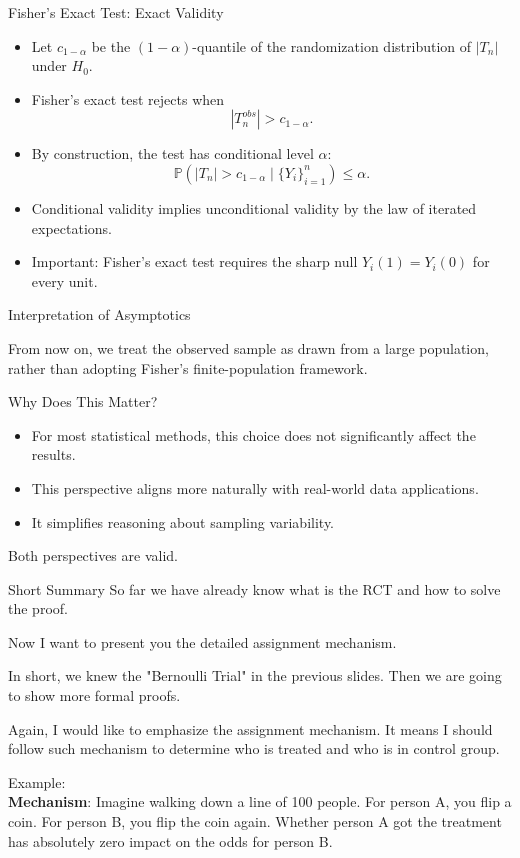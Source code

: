 \documentclass[11pt,aspectratio=169]{beamer}
\begin{document}
\begin{frame}{Fisher's Exact Test: Exact Validity}

\begin{itemize}
    \item Let $c_{1-\alpha}$ be the $(1-\alpha)$-quantile of the randomization distribution of $|T_n|$ under $H_0$.
    \item Fisher's exact test rejects when
    $$|T_n^{obs}| > c_{1-\alpha}.$$
    \item By construction, the test has conditional level $\alpha$:
    $$\mathbb{P}\left(|T_n| > c_{1-\alpha} \mid \{Y_i\}_{i=1}^n\right) \le \alpha.$$
    \item Conditional validity implies unconditional validity by the law of iterated expectations.
    \item Important: Fisher's exact test requires the sharp null $Y_i(1) = Y_i(0)$ for every unit.
\end{itemize}


\end{frame}

\begin{frame}{Interpretation of Asymptotics}

From now on, we treat the observed sample as drawn from a large population, rather than adopting Fisher's finite-population framework.

Why Does This Matter?
\begin{itemize}
    \item For most statistical methods, this choice does not significantly affect the results.
    \item This perspective aligns more naturally with real-world data applications.
    \item It simplifies reasoning about sampling variability.
\end{itemize}

Both perspectives are valid.
\end{frame}










\begin{frame}{Short Summary}
So far we have already know what is the RCT and how to solve the proof.


Now I want to present you the detailed assignment mechanism.

In short, we knew the "Bernoulli Trial" in the previous slides. Then we are going to show more formal proofs.

Again, I would like to emphasize the assignment mechanism. It means I should follow such mechanism to determine who is treated and who is in control group. 

Example: \\
\textbf{Mechanism}: Imagine walking down a line of 100 people. For person A, you flip a coin. For person B, you flip the coin again. Whether person A got the treatment has absolutely zero impact on the odds for person B.
\end{frame}
\end{document}
